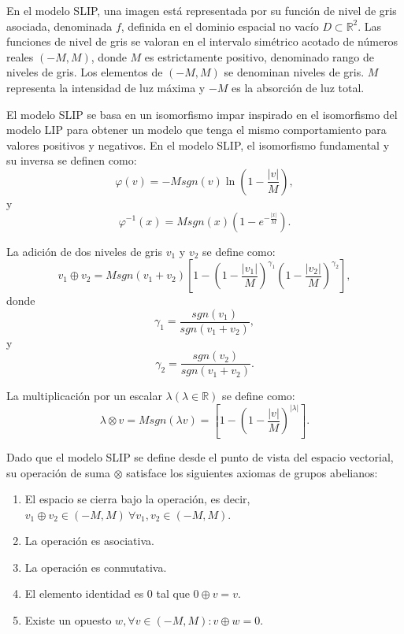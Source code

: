 En el modelo SLIP, una imagen está representada por su función de nivel de gris asociada, denominada $f$, definida en el dominio espacial no vacío $D \subset \mathbb{R}^2$. Las funciones de nivel de gris se valoran en el intervalo simétrico acotado de números reales $(-M, M)$, donde $M$ es estrictamente positivo, denominado rango de niveles de gris. Los elementos de $(-M, M )$ se denominan niveles de gris. $M$ representa la intensidad de luz máxima y $-M$ es la absorción de luz total.

El modelo SLIP se basa en un isomorfismo impar inspirado en el isomorfismo del modelo LIP para obtener un modelo que tenga el mismo comportamiento para valores positivos y negativos. En el modelo SLIP, el isomorfismo fundamental y su inversa se definen como:
\begin{equation}
	\varphi(v)=-Msgn(v)\ln\left(1-\frac{|v|}{M}\right),
\end{equation}
y
\begin{equation}
	\varphi^{-1}(x)=Msgn(x)\left(1-e^{-\frac{|x|}{M}}\right).
\end{equation}

La adición de dos niveles de gris $v_1$ y $v_2$ se define como:
\begin{equation}
	v_1\oplus v_2=Msgn(v_1+v_2)\left[1-\left(1-\frac{|v_1|}{M}\right)^{\gamma_1}\left(1-\frac{|v_2|}{M}\right)^{\gamma_2}\right],
\end{equation}
donde
\begin{equation}
	\gamma_1=\frac{sgn(v_1)}{sgn(v_1+v_2)},
\end{equation}
y
\begin{equation}
	\gamma_2=\frac{sgn(v_2)}{sgn(v_1+v_2)}.
\end{equation}

La multiplicación por un escalar $\lambda (\lambda \in \mathbb{R})$ se define como:
\begin{equation}
	\lambda \otimes v = Msgn(\lambda v)=\left[1-\left(1-\frac{|v|}{M}\right)^{|\lambda|}\right].
\end{equation}

Dado que el modelo SLIP se define desde el punto de vista del espacio vectorial, su operación de suma $\otimes$ satisface los siguientes axiomas de grupos abelianos:

\begin{enumerate}
	\item El espacio se cierra bajo la operación, es decir, $v_1\oplus v_2 \in (-M, M )~\forall v_1, v_2 \in (-M, M )$.
	\item La operación es asociativa.
	\item La operación es conmutativa.
	\item El elemento identidad es $0$ tal que $0\oplus v = v$.
	\item  Existe un opuesto $w, \forall v \in (-M, M ): v \oplus w = 0$.
\end{enumerate}
  
